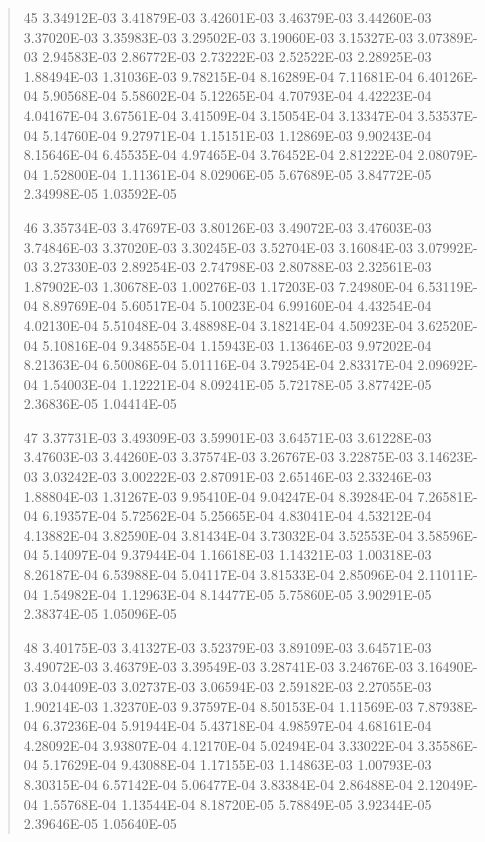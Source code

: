 \documentclass[letterpaper,10pt,english]{sphinxmanual}
\begin{document}
\begin{quote}
\begin{DUlineblock}{0em}
\item[] 45   3.34912E-03  3.41879E-03  3.42601E-03  3.46379E-03  3.44260E-03  3.37020E-03  3.35983E-03  3.29502E-03  3.19060E-03  3.15327E-03  3.07389E-03  2.94583E-03  2.86772E-03  2.73222E-03  2.52522E-03  2.28925E-03  1.88494E-03  1.31036E-03  9.78215E-04  8.16289E-04  7.11681E-04  6.40126E-04  5.90568E-04  5.58602E-04  5.12265E-04  4.70793E-04  4.42223E-04  4.04167E-04  3.67561E-04  3.41509E-04  3.15054E-04  3.13347E-04  3.53537E-04  5.14760E-04  9.27971E-04  1.15151E-03  1.12869E-03  9.90243E-04  8.15646E-04  6.45535E-04  4.97465E-04  3.76452E-04  2.81222E-04  2.08079E-04  1.52800E-04  1.11361E-04  8.02906E-05  5.67689E-05  3.84772E-05  2.34998E-05  1.03592E-05
\item[] 46   3.35734E-03  3.47697E-03  3.80126E-03  3.49072E-03  3.47603E-03  3.74846E-03  3.37020E-03  3.30245E-03  3.52704E-03  3.16084E-03  3.07992E-03  3.27330E-03  2.89254E-03  2.74798E-03  2.80788E-03  2.32561E-03  1.87902E-03  1.30678E-03  1.00276E-03  1.17203E-03  7.24980E-04  6.53119E-04  8.89769E-04  5.60517E-04  5.10023E-04  6.99160E-04  4.43254E-04  4.02130E-04  5.51048E-04  3.48898E-04  3.18214E-04  4.50923E-04  3.62520E-04  5.10816E-04  9.34855E-04  1.15943E-03  1.13646E-03  9.97202E-04  8.21363E-04  6.50086E-04  5.01116E-04  3.79254E-04  2.83317E-04  2.09692E-04  1.54003E-04  1.12221E-04  8.09241E-05  5.72178E-05  3.87742E-05  2.36836E-05  1.04414E-05
\item[] 47   3.37731E-03  3.49309E-03  3.59901E-03  3.64571E-03  3.61228E-03  3.47603E-03  3.44260E-03  3.37574E-03  3.26767E-03  3.22875E-03  3.14623E-03  3.03242E-03  3.00222E-03  2.87091E-03  2.65146E-03  2.33246E-03  1.88804E-03  1.31267E-03  9.95410E-04  9.04247E-04  8.39284E-04  7.26581E-04  6.19357E-04  5.72562E-04  5.25665E-04  4.83041E-04  4.53212E-04  4.13882E-04  3.82590E-04  3.81434E-04  3.73032E-04  3.52553E-04  3.58596E-04  5.14097E-04  9.37944E-04  1.16618E-03  1.14321E-03  1.00318E-03  8.26187E-04  6.53988E-04  5.04117E-04  3.81533E-04  2.85096E-04  2.11011E-04  1.54982E-04  1.12963E-04  8.14477E-05  5.75860E-05  3.90291E-05  2.38374E-05  1.05096E-05
\item[] 48   3.40175E-03  3.41327E-03  3.52379E-03  3.89109E-03  3.64571E-03  3.49072E-03  3.46379E-03  3.39549E-03  3.28741E-03  3.24676E-03  3.16490E-03  3.04409E-03  3.02737E-03  3.06594E-03  2.59182E-03  2.27055E-03  1.90214E-03  1.32370E-03  9.37597E-04  8.50153E-04  1.11569E-03  7.87938E-04  6.37236E-04  5.91944E-04  5.43718E-04  4.98597E-04  4.68161E-04  4.28092E-04  3.93807E-04  4.12170E-04  5.02494E-04  3.33022E-04  3.35586E-04  5.17629E-04  9.43088E-04  1.17155E-03  1.14863E-03  1.00793E-03  8.30315E-04  6.57142E-04  5.06477E-04  3.83384E-04  2.86488E-04  2.12049E-04  1.55768E-04  1.13544E-04  8.18720E-05  5.78849E-05  3.92344E-05  2.39646E-05  1.05640E-05

\end{DUlineblock}
\end{quote}
\end{document}
